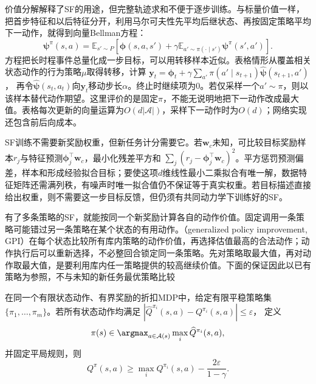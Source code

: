 价值分解解释了SF的用途，但完整轨迹求和不便于逐步训练。与标量价值一样，把首步特征和以后特征分开，利用马尔可夫性先平均后继状态、再按固定策略平均下一动作，就得到向量Bellman方程：
\begin{equation}
 \bm\psi^\pi(s,a)=
 \mathbb E_{s'\sim P}\left[\bm\phi(s,a,s')
 +\gamma\mathbb E_{a'\sim\pi(\cdot\mid s')}\bm\psi^\pi(s',a')\right].
 \label{eq:rl-transfer-sf-bellman}
\end{equation}
方程把长时程事件总量化成一步目标，可以用转移样本近似。表格情形从覆盖相关状态动作的行为策略$\mu$取得转移，计算
$\bm y_t=\bm\phi_t+\gamma\sum_{a'}\pi(a'\mid s_{t+1})\widehat{\bm\psi}(s_{t+1},a')$，
再令$\widehat{\bm\psi}(s_t,a_t)$向$\bm y_t$移动步长$\alpha$。终止时继续项为0。若仅采样一个$a'\sim\pi$，则以该样本替代动作期望。这里评价的是固定$\pi$，不能无说明地把下一动作改成最大值。表格每次更新的向量运算为$O(d|\mathcal A|)$，采样下一动作时为$O(d)$；网络实现还包含前后向成本。

SF训练不需要新奖励权重，但新任务计分需要它。若$\bm w_c$未知，可比较目标奖励样本$r_j$与特征预测$\bm\phi_j^\top\bm w_c$，最小化残差平方和
$\sum_j(r_j-\bm\phi_j^\top\bm w_c)^2$。平方惩罚预测偏差，样本和形成经验拟合目标；要使这项$d$维线性最小二乘拟合有唯一解，数据特征矩阵还需满列秩，有噪声时唯一拟合值仍不保证等于真实权重。若目标描述直接给出权重，则不需要这一步目标反馈，但仍须有共同动力学下训练好的SF。

有了多条策略的SF，就能按同一个新奖励计算各自的动作价值。固定调用一条策略可能错过另一条策略在某个状态的有用动作。（generalized policy improvement, GPI）在每个状态比较所有库内策略的动作价值，再选择估值最高的合法动作；动作执行后可以重新选择，不必整回合锁定同一条策略。先对策略取最大值，再对动作取最大值，是要利用库内任一策略提供的较高继续价值。下面的保证因此以已有策略为参照，不与未知的新任务最优策略比较

\begin{theorem}[有一致估计误差的广义策略改进]
 \label{thm:rl-transfer-gpi}
 在同一个有限状态动作、有界奖励的折扣MDP中，给定有限平稳策略集
 $\{\pi_1,\ldots,\pi_m\}$。若所有状态动作均满足
 $|\widehat Q^{\pi_i}(s,a)-Q^{\pi_i}(s,a)|\leq\varepsilon$，
 定义
 \[
 \pi(s)\in\argmax_{a\in\mathcal A(s)}\max_i\widehat Q^{\pi_i}(s,a),
 \]
 并固定平局规则，则
 \begin{equation}
 Q^\pi(s,a)\geq\max_iQ^{\pi_i}(s,a)
                -\frac{2\varepsilon}{1-\gamma}.
 \label{eq:rl-transfer-gpi-bound}
 \end{equation}
\end{theorem}

